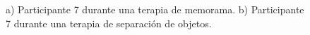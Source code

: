 \begin{figure}[h!]
        \centering
	\caption{a) Participante 7 durante una terapia de memorama. b) Participante 7 durante una terapia de separaci\'on de objetos.}\label{fig:imgtherapies}

\end{figure}

